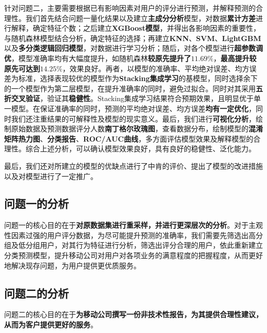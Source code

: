 \documentclass{MathorCupmodeling}
\begin{document}
	{\heiti 针对问题二}，主要需要根据已有影响因素对用户的评分进行预测，并解释预测的合理性。我们首先结合问题一量化结果以及建立\textbf{主成分分析}模型，对数据\textbf{累计方差}进行解释，确定特征个数；之后建立\textbf{XGBoost模型}，并得出各影响因素的重要性，与随机森林模型结合分析，确定特征的选择；再建立\textbf{KNN}、\textbf{SVM}、\textbf{LightGBM}以及\textbf{多分类逻辑回归模型}，对数据进行学习分析；随后，对各个模型进行\textbf{超参数调优}，模型准确率均有大幅度提升，如随机森林\textbf{较原先提升了}$\boldsymbol{11.69\%}$，\textbf{最高提升较原先可达到}$\boldsymbol{14.25\%}$，效果良好。再者，以模型的准确率、平均绝对误差、均方误差为标准，选择表现较优的模型作为\textbf{Stacking集成学习}的基模型，同时选择余下的一个模型作为第二层模型，在提升准确率的同时，避免过拟合。同时对其采用\textbf{五折交叉验证}，验证其\textbf{稳健性}。Stacking集成学习结果符合预期效果，且明显优于单一模型。在保证准确率的同时，预测的平均绝对误差、均方误差\textbf{均有一定优化}，同时我们还注重结果的可解释性及模型的现实意义。最后，我们进行\textbf{可视化分析}，绘制原始数据及预测数据评分人数\textbf{南丁格尔玫瑰图}，查看数据分布，绘制模型的\textbf{混淆矩阵热力图}、\textbf{分类报告}、\textbf{ROC/AUC曲线}，多方面评估模型效果及解释模型的合理性。综合上述分析，可以确认模型效果良好，具有良好的稳健性、泛化能力。
	
	{\heiti 最后}，我们还对所建立的模型的优缺点进行了中肯的评价、提出了模型的改进措施以及对模型进行了一定推广。

	\subsection{问题一的分析}
	问题一的核心目的在于\textbf{对原数据集进行重采样，并进行更深层次的分析}。对于主观性因素过强的用户评分数据，为尽可能提升预测的准确率，我们需要先筛选出高分组及低分组用户，对其行为特征进行分析，筛选出评分合理的用户，依此重新建立分类预测模型，提升移动公司对用户对各项业务的满意程度的把握程度，从而更好地解决现存问题，为用户提供更优质服务。
	\subsection{问题二的分析}
	问题二的核心目的在于\textbf{为移动公司撰写一份非技术性报告，为其提供合理性建议，从而为客户提供更好的服务}。
\end{document}
